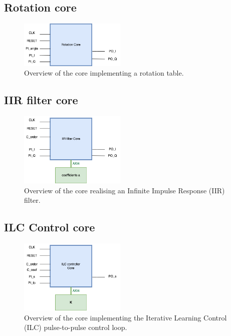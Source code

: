 \documentclass[12pt]{amsart}
\begin{document}
\subsection{Rotation core}


\begin{figure}[htbp] %
   \centering
   \includegraphics[width=2in]{im/ROTcore.png} 
   \caption{Overview of the core implementing a rotation table.}
   \label{fig:rotcore}
\end{figure}



\subsection{IIR filter core}

\begin{figure}[htbp] %
   \centering
   \includegraphics[width=2in]{im/IIRcore.png} 
   \caption{Overview of the  core realising an Infinite Impulse Response (IIR) filter.}
   \label{fig:iircore}
\end{figure}



\subsection{ILC Control core}

\begin{figure}[htbp] %
   \centering
   \includegraphics[width=2in]{im/ILCcore.png} 
   \caption{Overview of the core implementing the Iterative Learning Control (ILC) pulse-to-pulse control loop.}
   \label{fig:ilccore}
\end{figure}
\end{document}
